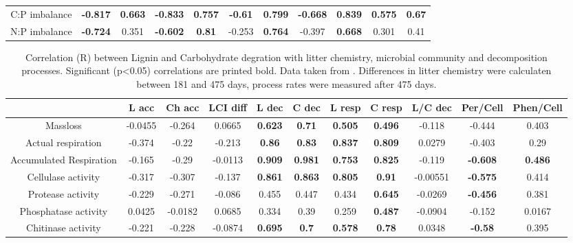 \documentclass[authoryear,preprint,review,12pt]{elsarticle}
\begin{document}
\begin{table}[h!]
\begin{center}
{\begin{tabular}{ccccccccccc}
  C:P imbalance & \textbf{ -0.817 } & \textbf{ 0.663 } & \textbf{ -0.833 } & \textbf{ 0.757 } & \textbf{ -0.61 } & \textbf{ 0.799 } & \textbf{ -0.668 } & \textbf{ 0.839 } & \textbf{ 0.575 } & \textbf{ 0.67 } \\ 
  N:P imbalance & \textbf{ -0.724 } & 0.351 & \textbf{ -0.602 } & \textbf{ 0.81 } & -0.253 & \textbf{ 0.764 } & -0.397 & \textbf{ 0.668 } & 0.301 & 0.41 \\ 
   \hline
\end{tabular}
}
\end{center}
\end{table}
\newpage
\begin{table}[h!]
\begin{center}
\caption{Correlation (R) between Lignin and Carbohydrate degration with litter chemistry, microbial community and decomposition processes. Significant (p<0.05) correlations are printed bold. Data taken from \cite{Mooshammer2011, Leitner2011}. Differences in litter chemistry were calculaten between 181 and 475 days, process rates were measured after 475 days.}
\label{corrtable2}
{\tiny
\begin{tabular}{ccccccccccc}
  \hline
 & L acc & Ch acc & LCI diff & L dec & C dec & L resp & C resp & L/C dec & Per/Cell & Phen/Cell \\ 
  \hline
Massloss & -0.0455 & -0.264 & 0.0665 & \textbf{ 0.623 } & \textbf{ 0.71 } & \textbf{ 0.505 } & \textbf{ 0.496 } & -0.118 & -0.444 & 0.403 \\ 
  Actual respiration & -0.374 & -0.22 & -0.213 & \textbf{ 0.86 } & \textbf{ 0.83 } & \textbf{ 0.837 } & \textbf{ 0.809 } & 0.0279 & -0.403 & 0.29 \\ 
  Accumulated Respiration & -0.165 & -0.29 & -0.0113 & \textbf{ 0.909 } & \textbf{ 0.981 } & \textbf{ 0.753 } & \textbf{ 0.825 } & -0.119 & \textbf{ -0.608 } & \textbf{ 0.486 } \\ 
  Cellulase activity & -0.317 & -0.307 & -0.137 & \textbf{ 0.861 } & \textbf{ 0.863 } & \textbf{ 0.805 } & \textbf{ 0.91 } & -0.00551 & \textbf{ -0.575 } & 0.414 \\ 
  Protease activity & -0.229 & -0.271 & -0.086 & 0.455 & 0.447 & 0.434 & \textbf{ 0.645 } & -0.0269 & \textbf{ -0.456 } & 0.381 \\ 
  Phosphatase activity & 0.0425 & -0.0182 & 0.0685 & 0.334 & 0.39 & 0.259 & \textbf{ 0.487 } & -0.0904 & -0.152 & 0.0167 \\ 
  Chitinase activity & -0.221 & -0.228 & -0.0874 & \textbf{ 0.695 } & \textbf{  0.7 } & \textbf{ 0.578 } & \textbf{ 0.78 } & 0.0348 & \textbf{ -0.58 } & 0.395 \\ 

\end{tabular}}
\end{center}
\end{table}
\end{document}

